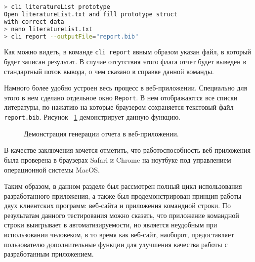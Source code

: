 \begin{lstlisting}[language=bash, caption = {Запрос отчета в приложении командной строки.}, captionpos=b, label={cli_report}]
> cli literatureList prototype
Open literatureList.txt and fill prototype struct 
with correct data
> nano literatureList.txt
> cli report --outputFile="report.bib"
\end{lstlisting}

Как можно видеть, в команде \texttt{cli report} явным образом указан файл, в который будет записан результат. В случае
отсутствия этого флага отчет будет выведен в стандартный поток вывода, о чем сказано в справке данной команды.

Намного более удобно устроен весь процесс в веб-приложении. Специально для этого в нем сделано отдельное окно \texttt{Report}.
В нем отображаются все списки литературы, по нажатию на которые браузером сохраняется текстовый файл \texttt{report.bib}.
Рисунок ~\ref{web_report} демонстрирует данную функцию.

\begin{figure}[h!]
	\caption{Демонстрация генерации отчета в веб-приложении.}
	\label{web_report}
\end{figure}

В качестве заключения хочется отметить, что работоспособность веб-приложения была проверена в браузерах Safari и Chrome на ноутбуке
под управлением операционной системы MacOS.

Таким образом, в данном разделе был рассмотрен полный цикл использования разработанного приложения, а также был продемонстрирован
принцип работы двух клиентских программ: веб-сайта и приложения командной строки. По результатам данного тестирования можно сказать, что
приложение командной строки выигрывает в автоматизируемости, но является неудобным при использовании человеком, в то время как 
веб-сайт, наоборот, предоставляет пользователю дополнительные функции для улучшения качества работы с разработанным приложением.
